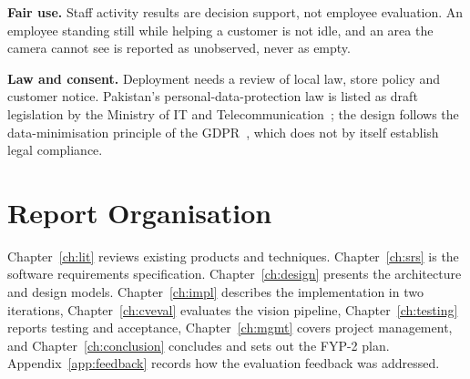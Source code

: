 \textbf{Fair use.} Staff activity results are decision support, not employee evaluation. An employee standing still while helping a customer is not idle, and an area the camera cannot see is reported as unobserved, never as empty.

\textbf{Law and consent.} Deployment needs a review of local law, store policy and customer notice. Pakistan's personal-data-protection law is listed as draft legislation by the Ministry of IT and Telecommunication~\cite{pakistanMoittLegislation}; the design follows the data-minimisation principle of the GDPR~\cite{gdpr2016}, which does not by itself establish legal compliance.

\section{Report Organisation}
Chapter~\ref{ch:lit} reviews existing products and techniques. Chapter~\ref{ch:srs} is the software requirements specification. Chapter~\ref{ch:design} presents the architecture and design models. Chapter~\ref{ch:impl} describes the implementation in two iterations, Chapter~\ref{ch:cveval} evaluates the vision pipeline, Chapter~\ref{ch:testing} reports testing and acceptance, Chapter~\ref{ch:mgmt} covers project management, and Chapter~\ref{ch:conclusion} concludes and sets out the FYP-2 plan. Appendix~\ref{app:feedback} records how the evaluation feedback was addressed.
